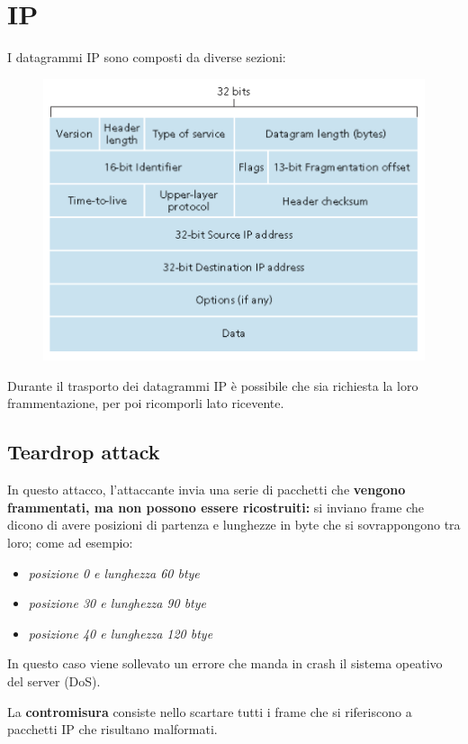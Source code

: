 \section{IP}
I datagrammi IP sono composti da diverse sezioni:
\begin{figure}[H]
    \centering
    \includegraphics[width=0.8\linewidth]{chapters/8/images/ip.png}
\end{figure}

\noindent Durante il trasporto dei datagrammi IP è possibile che sia richiesta la loro frammentazione, 
per poi ricomporli lato ricevente.

\subsection{Teardrop attack}

In questo attacco, l'attaccante invia una serie di pacchetti che \textbf{vengono 
frammentati, ma non possono essere ricostruiti:} si inviano frame che dicono di avere 
posizioni di partenza e lunghezze in byte che si sovrappongono tra loro; come ad esempio:
\begin{itemize}
    \item \textit{posizione 0 e lunghezza 60 btye}
    \item \textit{posizione 30 e lunghezza 90 btye}
    \item \textit{posizione 40 e lunghezza 120 btye}
\end{itemize}

\noindent In questo caso viene sollevato un errore che manda in crash il sistema opeativo 
del server (DoS).

\noindent La \textbf{contromisura} consiste nello scartare tutti i frame che si riferiscono 
a pacchetti IP che risultano malformati.

